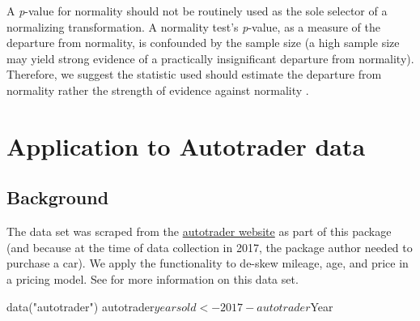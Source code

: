 \begin{Schunk}
\end{Schunk}

A \textit{p}-value for normality should not be routinely used as the
sole selector of a normalizing transformation. A normality test's
\textit{p}-value, as a measure of the departure from normality, is
confounded by the sample size (a high sample size may yield strong
evidence of a practically insignificant departure from normality).
Therefore, we suggest the statistic used should estimate the departure
from normality rather the strength of evidence against normality
\citep[e.g.,][]{normality}.

\hypertarget{application-to-autotrader-data}{%
\section{Application to Autotrader
data}\label{application-to-autotrader-data}}

\hypertarget{background}{%
\subsection{Background}\label{background}}

The  data set was scraped from the
\href{https://www.autotrader.com/}{autotrader website} as part of this
package (and because at the time of data collection in 2017, the package
author needed to purchase a car). We apply the 
functionality to de-skew mileage, age, and price in a pricing model. See
 for more information on this data set.

\begin{Schunk}
\begin{Sinput}
data("autotrader")
autotrader$yearsold <- 2017 - autotrader$Year
\end{Sinput}
\end{Schunk}

